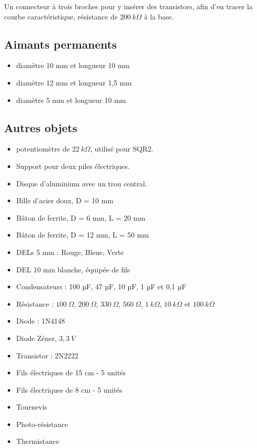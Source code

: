 \documentclass{book}
\begin{document}
Un connecteur à trois broches pour y insérer des transistors, afin d'en tracer la courbe caractéristique, résistance de $200\ k\Omega$  à la base.




\subsection{Aimants permanents}





\begin{itemize}
  \item diamètre 10 mm et longueur 10 mm
  \item diamètre 12 mm et longueur 1,5 mm
  \item diamètre 5 mm et longueur 10 mm
\end{itemize}




\subsection{Autres objets}





\begin{itemize}
  \item potentiomètre de $22\ k\Omega$, utilisé pour SQR2.
  \item Support pour deux piles électriques.
  \item Disque d'aluminium avec un trou central.
  \item Bille d'acier doux, D = 10 mm
  \item Bâton de ferrite, D = 6 mm, L = 20 mm
  \item Bâton de ferrite, D = 12 mm, L = 50 mm
  \item DELs 5 mm  : Rouge, Bleue, Verte
  \item DEL 10 mm blanche, équipée de fils
  \item Condensateurs : 100 µF, 47 µF, 10 µF, 1 µF et 0,1 µF
  \item Résistance : $100\ \Omega$, $200\ \Omega$, $330\ \Omega$, $560\ \Omega$, $1\ k\Omega$, $10\ k\Omega$  et $100\ k\Omega$
  \item Diode : 1N4148
  \item Diode Zéner, $3,3\ V$
  \item Transistor : 2N2222
  \item Fils électriques de 15 cm - 5 unités
  \item Fils électriques de 8 cm - 5 unités
  \item Tournevis
  \item Photo-résistance
  \item Thermistance
\end{itemize}
\end{document}
